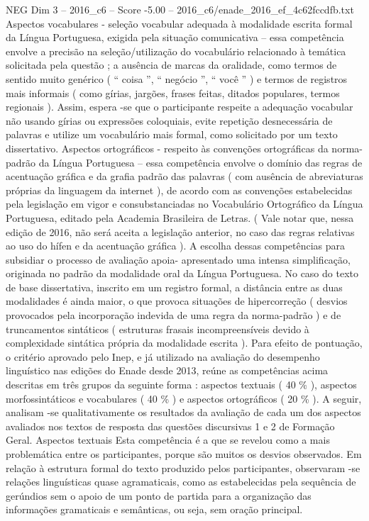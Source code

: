 \begin{textsample}{NEG Dim 3 – 2016\_c6 – Score -5.00 – 2016\_c6/enade\_2016\_ef\_4c62fccdfb.txt}
Aspectos vocabulares - seleção vocabular adequada à modalidade escrita formal da Língua Portuguesa, exigida pela situação comunicativa – essa competência envolve a precisão na seleção/utilização do vocabulário relacionado à temática solicitada pela questão ; a ausência de marcas da oralidade, como termos de sentido muito genérico ( “ coisa ”, “ negócio ”, “ você ” ) e termos de registros mais informais ( como gírias, jargões, frases feitas, ditados populares, termos regionais ).
Assim, espera -se que o participante respeite a adequação vocabular não usando gírias ou expressões coloquiais, evite repetição desnecessária de palavras e utilize um vocabulário mais formal, como solicitado por um texto dissertativo.
Aspectos ortográficos - respeito às convenções ortográficas da norma-padrão da Língua Portuguesa – essa competência envolve o domínio das regras de acentuação gráfica e da grafia padrão das palavras ( com ausência de abreviaturas próprias da linguagem da internet ), de acordo com as convenções estabelecidas pela legislação em vigor e consubstanciadas no Vocabulário Ortográfico da Língua Portuguesa, editado pela Academia Brasileira de Letras. ( Vale notar que, nessa edição de 2016, não será aceita a legislação anterior, no caso das regras relativas ao uso do hífen e da acentuação gráfica ).
A escolha dessas competências para subsidiar o processo de avaliação apoia- apresentado uma intensa simplificação, originada no padrão da modalidade oral da Língua Portuguesa.
No caso do texto de base dissertativa, inscrito em um registro formal, a distância entre as duas modalidades é ainda maior, o que provoca situações de hipercorreção ( desvios provocados pela incorporação indevida de uma regra da norma-padrão ) e de truncamentos sintáticos ( estruturas frasais incompreensíveis devido à complexidade sintática própria da modalidade escrita ).
Para efeito de pontuação, o critério aprovado pelo Inep, e já utilizado na avaliação do desempenho linguístico nas edições do Enade desde 2013, reúne as competências acima descritas em três grupos da seguinte forma : aspectos textuais ( 40 \% ), aspectos morfossintáticos e vocabulares ( 40 \% ) e aspectos ortográficos ( 20 \% ).
A seguir, analisam -se qualitativamente os resultados da avaliação de cada um dos aspectos avaliados nos textos de resposta das questões discursivas 1 e 2 de Formação Geral.
Aspectos textuais Esta competência é a que se revelou como a mais problemática entre os participantes, porque são muitos os desvios observados.
Em relação à estrutura formal do texto produzido pelos participantes, observaram -se relações linguísticas quase agramaticais, como as estabelecidas pela sequência de gerúndios sem o apoio de um ponto de partida para a organização das informações gramaticais e semânticas, ou seja, sem oração principal.

\end{textsample}
